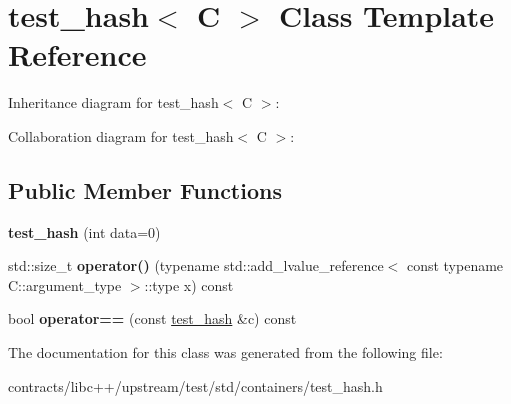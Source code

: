 \hypertarget{classtest__hash}{}\section{test\+\_\+hash$<$ C $>$ Class Template Reference}
\label{classtest__hash}


Inheritance diagram for test\+\_\+hash$<$ C $>$\+:


Collaboration diagram for test\+\_\+hash$<$ C $>$\+:
\subsection*{Public Member Functions}
\begin{DoxyCompactItemize}
\item 
\mbox{\label{classtest__hash_a8152717e020fcc1fc141217c5bb1e6f4}} 
{\bfseries test\+\_\+hash} (int data=0)
\item 
\mbox{\label{classtest__hash_afbd26432e3ac4ddc5fc55ded709ff1bb}} 
std\+::size\+\_\+t {\bfseries operator()} (typename std\+::add\+\_\+lvalue\+\_\+reference$<$ const typename C\+::argument\+\_\+type $>$\+::type x) const
\item 
\mbox{\label{classtest__hash_aa24524505bdd849a2adcec9ad43e9f1f}} 
bool {\bfseries operator==} (const \mbox{\hyperlink{classtest__hash}{test\+\_\+hash}} \&c) const
\end{DoxyCompactItemize}


The documentation for this class was generated from the following file\+:\begin{DoxyCompactItemize}
\item 
contracts/libc++/upstream/test/std/containers/test\+\_\+hash.\+h\end{DoxyCompactItemize}
